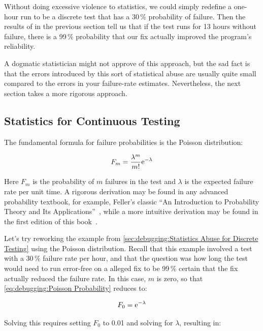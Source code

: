 Without doing excessive violence to statistics, we could simply
redefine a one-hour run to be a discrete test that has a 30\,\%
probability of failure.
Then the results of in the previous section tell us that if the test
runs for 13 hours without failure, there is a 99\,\% probability that
our fix actually improved the program's reliability.

A dogmatic statistician might not approve of this approach, but the sad
fact is that the errors introduced by this sort of statistical abuse are
usually quite small compared to the errors in your failure-rate estimates.
Nevertheless, the next section takes a more rigorous approach.

\subsection{Statistics for Continuous Testing}
\label{sec:debuggingStatistics for Continuous Testing}

The fundamental formula for failure probabilities is the Poisson
distribution:

\begin{equation}
	F_m = \frac{\lambda^m}{m!} \mathrm{e}^{-\lambda}
\label{eq:debugging:Poisson Probability}
\end{equation}

Here $F_m$ is the probability of $m$ failures in the test and
$\lambda$ is the expected failure rate per unit time.
A rigorous derivation may be found in any advanced probability
textbook, for example, Feller's classic ``An Introduction to Probability
Theory and Its Applications''~\cite{Feller58}, while a more
intuitive derivation may be found in the first edition of
this book~\cite[Equations 11.8--11.26]{McKenney2014ParallelProgramming-e1}.

Let's try reworking the example from
\cref{sec:debugging:Statistics Abuse for Discrete Testing}
using the Poisson distribution.
Recall that this example involved a test with a 30\,\% failure rate per
hour, and that the question was how long the test would need to run
error-free
on a alleged fix to be 99\,\% certain that the fix actually reduced the
failure rate.
In this case, $m$ is zero, so that
\cref{eq:debugging:Poisson Probability} reduces to:

\begin{equation}
	F_0 =  \mathrm{e}^{-\lambda}
\end{equation}

Solving this requires setting $F_0$
to 0.01 and solving for $\lambda$, resulting in:

